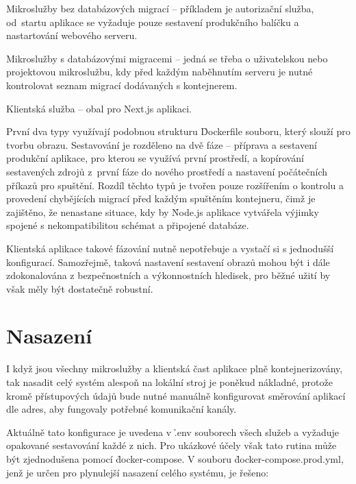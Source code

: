 \begin{dl}
   \item[Mikroslužby bez databázových migrací] – příkladem je autorizační služba, od~startu aplikace se vyžaduje pouze sestavení produkčního balíčku a nastartování webového serveru.
   \item[Mikroslužby s databázovými migracemi] – jedná se třeba o uživatelskou nebo projektovou mikroslužbu, kdy před každým naběhnutím serveru je nutné kontrolovat seznam migrací dodávaných s kontejnerem.
   \item[Klientská služba] – obal pro Next.js aplikaci.
\end{dl}

První dva typy využívají podobnou strukturu \h{Dockerfile} souboru, který slouží pro tvorbu obrazu.
Sestavování je rozděleno na dvě fáze – příprava a sestavení produkční aplikace, pro kterou se využívá první prostředí, a kopírování sestavených zdrojů z~první fáze do nového prostředí a nastavení počátečních příkazů pro spuštění.
Rozdíl těchto typů je tvořen pouze rozšířením o kontrolu a provedení chybějících migrací před každým spuštěním kontejneru, čimž je zajištěno, že nenastane situace, kdy by \h{Node.js} aplikace vytvářela výjimky spojené s nekompatibilitou  schémat a připojené databáze.

Klientská aplikace takové fázování nutně nepotřebuje a vystačí si s jednodušší konfigurací.
Samozřejmě, taková nastavení sestavení obrazů mohou být i dále zdokonalována z bezpečnostních a výkonnostních hledisek, pro běžné užití by však měly být dostatečně robustní.



\newpage

\section{Nasazení}\label{sec:deployment}
I když jsou všechny mikroslužby a klientská čast aplikace plně kontejnerizovány, tak nasadit celý systém alespoň na lokální stroj je poněkud nákladné, protože kromě přístupových údajů bude nutné manuálně konfigurovat směrování aplikací dle  adres, aby fungovaly potřebné komunikační kanály.

Aktuálně tato konfigurace je uvedena v \h{.env} souborech všech služeb a vyžaduje opakované sestavování každé z nich.
Pro ukázkové účely však tato rutina může být zjednodušena pomocí \h{docker-compose}.
V souboru \h{docker-compose.prod.yml}, jenž je určen pro plynulejší nasazení celého systému, je řešeno:

